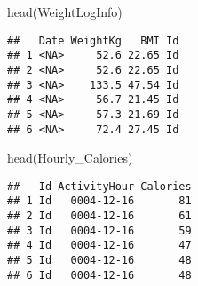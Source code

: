 \documentclass[
]{article}
\newenvironment{Shaded}{\begin{snugshade}}{\end{snugshade}}
\newcommand{\FunctionTok}[1]{\textcolor[rgb]{0.00,0.00,0.00}{#1}}
\newcommand{\NormalTok}[1]{#1}
\newcommand{\OtherTok}[1]{\textcolor[rgb]{0.56,0.35,0.01}{#1}}
\newcommand{\SpecialCharTok}[1]{\textcolor[rgb]{0.00,0.00,0.00}{#1}}
\begin{document}
\begin{Shaded}
\end{Shaded}

\begin{Shaded}
\begin{Highlighting}[]
\FunctionTok{head}\NormalTok{(WeightLogInfo)}
\end{Highlighting}
\end{Shaded}

\begin{verbatim}
##   Date WeightKg   BMI Id
## 1 <NA>     52.6 22.65 Id
## 2 <NA>     52.6 22.65 Id
## 3 <NA>    133.5 47.54 Id
## 4 <NA>     56.7 21.45 Id
## 5 <NA>     57.3 21.69 Id
## 6 <NA>     72.4 27.45 Id
\end{verbatim}

\begin{Shaded}
\end{Shaded}

\begin{Shaded}
\end{Shaded}

\begin{Shaded}
\begin{Highlighting}[]
\FunctionTok{head}\NormalTok{(Hourly\_Calories)}
\end{Highlighting}
\end{Shaded}

\begin{verbatim}
##   Id ActivityHour Calories
## 1 Id   0004-12-16       81
## 2 Id   0004-12-16       61
## 3 Id   0004-12-16       59
## 4 Id   0004-12-16       47
## 5 Id   0004-12-16       48
## 6 Id   0004-12-16       48
\end{verbatim}
\end{document}

